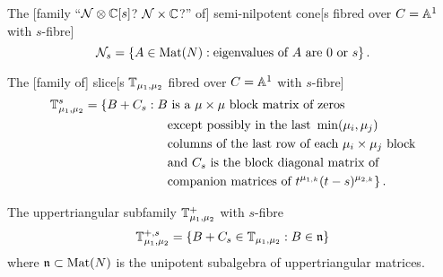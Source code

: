 \documentclass{article}
\begin{document}
 
% 

The [family ``$\cN\otimes\CC[s]$? $\cN\times\CC$?'' of] semi-nilpotent cone[s fibred over $C = \AA^1$ with $s$-fibre] 
\begin{equation}
    \cN_s = \{A \in \mat(N) : \text{eigenvalues of } A \text{ are } 0 \text{ or }s\}\,.
\end{equation}

The [family of] slice[s $\TT_{\mu_1,\mu_2}$ fibred over $C=\AA^1$ with $s$-fibre]
\begin{equation}
    \begin{split}
        \TT_{\mu_1,\mu_2}^s = \{ B + C_s: B &\text{ is a }\mu\times\mu \text{ block matrix of zeros} \\
        &\text{except possibly in the last }\min(\mu_i,\mu_j) \\ 
        &\text{columns of the last row of each }\mu_i\times\mu_j \text{ block} \\
        &\text{and } C_s \text{ is the block diagonal matrix of}\\
        &\text{companion matrices of } t^{\mu_{1,k}}(t-s)^{\mu_{2,k}}\}\,.
    \end{split}
\end{equation}

The uppertriangular subfamily $\TT_{\mu_1,\mu_2}^{+}$ with $s$-fibre
\begin{equation}
    \TT_{\mu_1,\mu_2}^{+,s} = \{B + C_s \in \TT_{\mu_1,\mu_2} : B \in\n\}
\end{equation}
where $\n\subset\mat(N)$ is the unipotent subalgebra of uppertriangular matrices. 

\end{document}
